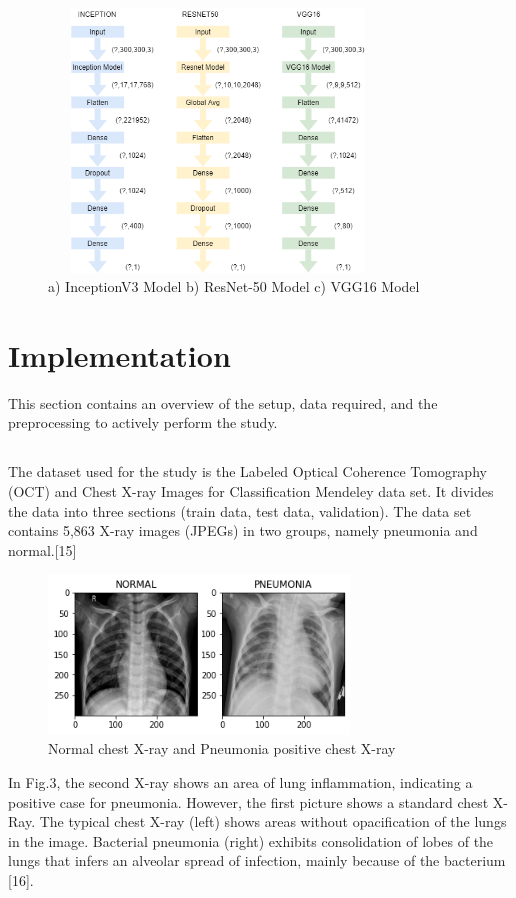 \documentclass[conference]{IEEEtran}
\begin{document}
\begin{figure}
\centering
\includegraphics[width=9cm,height=7cm]{1.png}
\caption{a) InceptionV3 Model b) ResNet-50 Model c) VGG16 Model}
\label{fig:cenario}
\end{figure}

\section{Implementation}
This section contains an overview of the setup, data required, and the preprocessing to actively perform the study.

\subsection{}
The dataset used for the study is the Labeled Optical Coherence Tomography (OCT) and Chest X-ray Images for Classification Mendeley data set. It divides the data into three sections (train data, test data, validation). The data set contains 5,863 X-ray images (JPEGs) in two groups, namely pneumonia and normal.[15]

\begin{figure}
\centering
\includegraphics[width=8cm]{index.png}
\caption{Normal chest X-ray and Pneumonia positive chest X-ray }
\label{fig:cenario}
\end{figure}

In Fig.3, the second X-ray shows an area of lung inflammation, indicating a positive case for pneumonia. However, the first picture shows a standard chest X-Ray. The typical chest X-ray (left) shows areas without opacification of the lungs in the image. Bacterial pneumonia (right) exhibits consolidation of lobes of the lungs that infers an alveolar spread of infection, mainly because of the bacterium [16].
\end{document}
